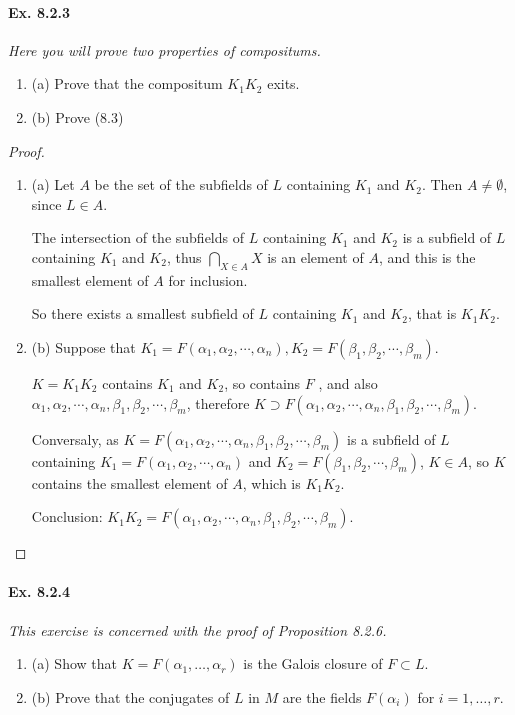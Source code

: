 \documentclass[11pt,a4paper]{article}
\newcommand{\be} {\begin{enumerate}}
\newcommand{\ee} {\end{enumerate}}
\begin{document}
\paragraph{Ex. 8.2.3}

{\it Here you will prove two properties of compositums.
\be
\item[(a)] Prove that the compositum $K_1K_2$ exits.
\item[(b)] Prove (8.3)
\ee
}

\begin{proof}
\be
\item[(a)] Let $A$ be the set of the subfields of $L$ containing $K_1$ and $K_2$. Then $A \neq \emptyset$, since $L \in A$.

The intersection of the subfields of $L$ containing $K_1$ and $K_2$ is a subfield of $L$ containing $ K_1$ and $K_2$, thus
$\bigcap\limits_{X \in A} X$ is an element of $A$, and this is the smallest element of $A$ for inclusion.

So there exists a smallest subfield of $L$ containing $K_1$ and $K_2$, that is $K_1K_2$.

\item[(b)] Suppose that $K_1 = F(\alpha_1,\alpha_2,\cdots,\alpha_n), K_2 = F(\beta_1,\beta_2,\cdots,\beta_m)$.

$K = K_1K_2$ contains $K_1$ and $K_2$, so contains  $F$ , and also $\alpha_1,\alpha_2,\cdots,\alpha_n,\beta_1,\beta_2,\cdots,\beta_m$, therefore $K \supset F(\alpha_1,\alpha_2,\cdots,\alpha_n,\beta_1,\beta_2,\cdots,\beta_m)$.

Conversaly, as $K = F(\alpha_1,\alpha_2,\cdots,\alpha_n,\beta_1,\beta_2,\cdots,\beta_m)$ is a subfield of $L$ containing $K_1 = F(\alpha_1,\alpha_2,\cdots,\alpha_n)$ and $K_2 = F(\beta_1,\beta_2,\cdots,\beta_m)$, $K \in A$, so $K$ contains the smallest element of $A$, which is $K_1K_2$.

Conclusion: $K_1K_2 =  F(\alpha_1,\alpha_2,\cdots,\alpha_n,\beta_1,\beta_2,\cdots,\beta_m)$.
\ee
\end{proof}

\paragraph{Ex. 8.2.4}

{\it This exercise is concerned with the proof of Proposition 8.2.6.
\be
\item[(a)] Show that $K = F(\alpha_1,\ldots,\alpha_r)$ is the Galois closure of $F \subset L$.
\item[(b)] Prove that the conjugates of $L$ in $M$ are the fields $F(\alpha_i)$ for $i=1,\ldots,r$.
\ee
}
\end{document}
